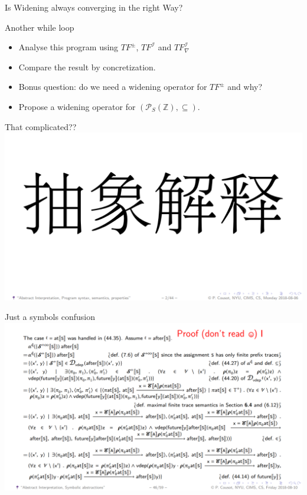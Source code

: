 \begin{frame}{Is Widening always converging in the right Way?}
\begin{exampleblock}{Another while loop}
	\centering 
	\begin{itemize}
		\item Analyse this program using  $TF^{\scriptscriptstyle \pm}$, $TF^{\scriptscriptstyle \mathcal{I}}$ and $TF^{\scriptscriptstyle \mathcal{I}}_{\scriptscriptstyle \nabla}$
		\item Compare the result by concretization.
		\item Bonus question: do we need a widening operator for $TF^{\scriptscriptstyle \pm}$ and why?
		\item Propose a widening operator for $(\mathcal{P}_S(\mathbb{Z}), \subseteq)$.
		\end{itemize}
	\end{exampleblock}
\end{frame}



\begin{frame}{That complicated??}
\centering
\includegraphics[scale=0.60]{content/images/static-analysis/Abstractcousot.png}
\end{frame}


\begin{frame}{Just a symbols confusion}
\centering
\includegraphics[scale=0.45]{content/images/static-analysis/abstractword.png}
\end{frame}

